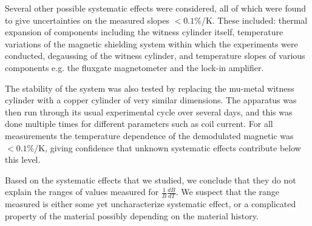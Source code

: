 
Several other possible systematic effects were considered, all of
which were found to give uncertainties on the measured slopes
$<0.1\%$/K.  These included: thermal expansion of components including
the witness cylinder itself, temperature variations of the magnetic
shielding system within which the experiments were conducted,
degaussing of the witness cylinder, and temperature slopes of various
components e.g. the fluxgate magnetometer and the lock-in amplifier.

The stability of the system was also tested by replacing the mu-metal
witness cylinder with a copper cylinder of very similar dimensions.
The apparatus was then run through its usual experimental cycle over
several days, and this was done multiple times for different
parameters such as coil current.  For all measurements the temperature
dependence of the demodulated magnetic was $<0.1$\%/K, giving
confidence that unknown systematic effects contribute below this
level.


%

Based on the systematic effects that we studied, we conclude that they
do not explain the ranges of values measured for
$\frac{1}{B}\frac{dB}{dT}$.  We suspect that the range measured is
either some yet uncharacterize systematic effect, or a complicated
property of the material possibly depending on the material history.


